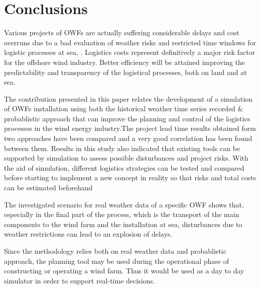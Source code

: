 \section{Conclusions}
Various projects of OWFs are actually suffering considerable delays and cost overruns due to a bad evaluation of weather risks and restricted time windows for logistic processes at sea, \cite{TCE12, ISOPE2013}. Logistics costs represent definitively a major risk factor for the offshore wind industry. Better efficiency will be attained improving the predictability and transparency of the logistical processes, both on land and at sea.

The contribution presented in this paper relates the development of a simulation of OWFs installation using both the historical weather time series recorded $\&$ probablistic approach that can improve the planning and control of the logistics processes in the wind energy industry.The project lead time results obtained form two approaches have been compared and a very good correlation has been found between them. Results in this study also  indicated that existing tools can be supported by simulation to assess possible disturbances and project risks. With the aid of simulation, different logistics strategies can be tested and compared before starting to implement a new concept in reality so that risks and total costs can be estimated beforehand

The investigated scenario for real weather data of a specific OWF shows that, especially in the final part of the process, which is the transport of the main components to the wind farm and the installation at sea, disturbances due to weather restrictions can lead to an explosion of delays. 

Since the methodology relies both on real weather data and probablistic approach, the planning tool may be used during the operational phase of constructing or operating a wind farm. Thus it would be used as a day to day simulator in order to support real-time decisions.

